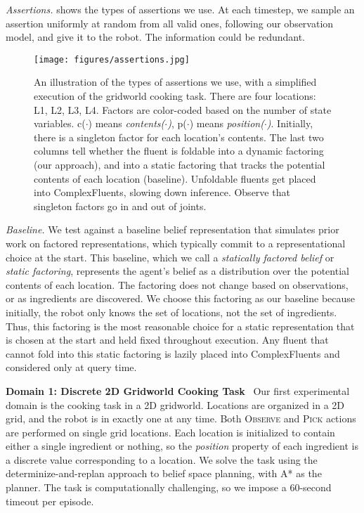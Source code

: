 \emph{Assertions.}  shows the types of
assertions we use. At each timestep, we sample an assertion uniformly
at random from all valid ones, following our observation model, and
give it to the robot. The information could be redundant.

\begin{figure}[t]
  \vspace{0.6em}
  \centering
    \noindent
    \texttt{[image: figures/assertions.jpg]}
    \caption{An illustration of the types of assertions we use, with a
      simplified execution of the gridworld cooking task. There are
      four locations: L1, L2, L3, L4. Factors are color-coded based on
      the number of state variables. c($\cdot$) means
      \emph{contents($\cdot$)}, p($\cdot$) means
      \emph{position($\cdot$)}. Initially, there is a singleton factor
      for each location's contents. The last two columns tell whether
      the fluent is foldable into a dynamic factoring (our approach),
      and into a static factoring that tracks the potential contents
      of each location (baseline). Unfoldable fluents get placed into
      ComplexFluents, slowing down inference. Observe that singleton
      factors go in and out of joints.}
  \label{fig:assertions}
\end{figure}

\emph{Baseline.} We test against a baseline belief representation that
simulates prior work on factored representations, which typically
commit to a representational choice at the start. This baseline, which
we call a \emph{statically factored belief} or \emph{static
  factoring}, represents the agent's belief as a distribution over the
potential contents of each location. The factoring does not change
based on observations, or as ingredients are discovered. We choose
this factoring as our baseline because initially, the robot only knows
the set of locations, not the set of ingredients. Thus, this factoring
is the most reasonable choice for a static representation that is
chosen at the start and held fixed throughout execution. Any fluent
that cannot fold into this static factoring is lazily placed into
ComplexFluents and considered only at query time.

\textbf{Domain 1: Discrete 2D Gridworld Cooking Task} \ Our first
experimental domain is the cooking task in a 2D gridworld. Locations
are organized in a 2D grid, and the robot is in exactly one at any
time. Both \textsc{Observe} and \textsc{Pick} actions are performed on
single grid locations. Each location is initialized to contain either
a single ingredient or nothing, so the \emph{position} property of
each ingredient is a discrete value corresponding to a location. We
solve the task using the determinize-and-replan approach to belief
space planning, with A* as the planner. The task is computationally
challenging, so we impose a 60-second timeout per episode.

